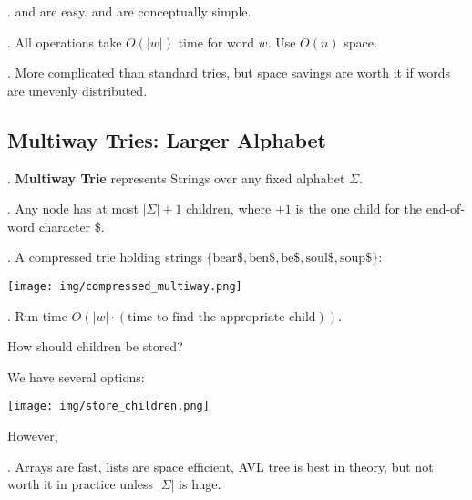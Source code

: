\documentclass{article}
\begin{document}
\begin{codes}[].
     and  are easy.  and  are conceptually simple. 
\end{codes}

\begin{result}[].
    All operations take $O(|w|)$ time for word $w$. Use $O(n)$ space. 
\end{result}

\begin{comm}[].
    More complicated than standard tries, but space savings are worth it if words are unevenly distributed. 
\end{comm}

\subsection{Multiway Tries: Larger Alphabet} 

\begin{deff}.
    \textbf{Multiway Trie} represents Strings over any fixed alphabet $\Sigma$. 
\end{deff}

\begin{discovery}[].
    Any node has at most $|\Sigma| + 1$ children, where $+1$ is the one child for the end-of-word character \$. 
\end{discovery}

\begin{examplee}[].
    A compressed trie holding strings $\{\text{bear}\$, \text{ben}\$, \text{be}\$, \text{soul}\$, \text{soup}\$\}$: \begin{center}
        \texttt{[image: img/compressed\_multiway.png]}
    \end{center}
\end{examplee}

\begin{discovery}[].
    Run-time $O(|w| \cdot (\text{time to find the appropriate child}))$. 
\end{discovery}

\begin{Question}{}
    How should children be stored? 
\end{Question}

\begin{solution} 
    We have several options: 
    \begin{center}
        \texttt{[image: img/store\_children.png]}
    \end{center} 
    However, \begin{result}[].
        Arrays are fast, lists are space efficient, AVL tree is best in theory, but not worth it in practice unless $|\Sigma|$ is huge. 
    \end{result}
\end{solution}
\end{document}
